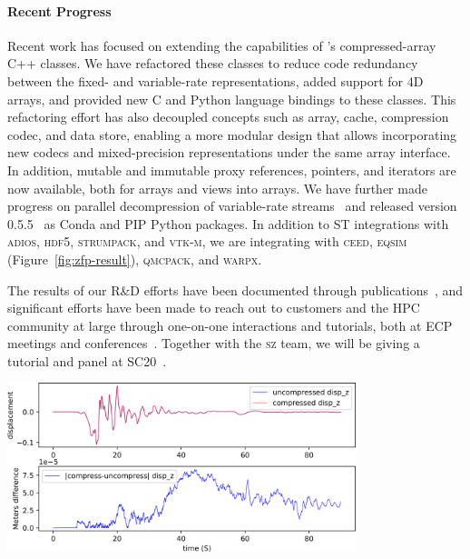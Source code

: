 \paragraph{Recent Progress}

Recent work has focused on extending the capabilities of {\zfp}'s compressed-array C++ classes.  We have refactored these classes to reduce code redundancy between the fixed- and variable-rate representations, added support for 4D arrays, and provided new C and Python language bindings to these classes.  This refactoring effort has also decoupled concepts such as array, cache, compression codec, and data store, enabling a more modular design that allows incorporating new codecs and mixed-precision representations under the same array interface.  In addition, mutable and immutable proxy references, pointers, and iterators are now available, both for arrays and views into arrays.  We have further made progress on parallel decompression of variable-rate streams~\cite{zfp-pdp2020} and released {\zfp} version 0.5.5~\cite{zfp-code} as Conda and PIP Python packages.
In addition to ST integrations with \textsc{adios}, \textsc{hdf5}, \textsc{strumpack}, and \textsc{vtk-m}, we are integrating {\zfp} with \textsc{ceed}, \textsc{eqsim} (Figure~\ref{fig:zfp-result}), \textsc{qmcpack}, and \textsc{warpx}.

The results of our R\&D efforts have been documented through publications~\cite{zfp-isc2017,zfp-jsm2017,zfp-sisc2019,zfp-drbsd2019,zfp-pdp2020,zfp-vis2020}, and significant efforts have been made to reach out to customers and the HPC community at large through one-on-one interactions and tutorials, both at ECP meetings and conferences~\cite{zfp-isc2017-tut,zfp-sc2017-tut,zfp-ep2018-tut,zfp-sc2018-tut,zfp-isc2019-tut,zfp-sc2019-tut}.  Together with the \textsc{sz} team, we will be giving a tutorial and panel at SC20~\cite{zfp-sc2020-tut,zfp-sc2020-pan}.

\noindent
\begin{minipage}[t]{\textwidth}
\vspace{0pt}%
\centering%
\includegraphics[width=4in]{projects/2.3.4-DataViz/2.3.4.16-ALPINE-ZFP/zfp-sw4}%
\vspace{-2ex}%
\captionsetup{width=\linewidth}%
%
\label{fig:zfp-result}%
\end{minipage}

